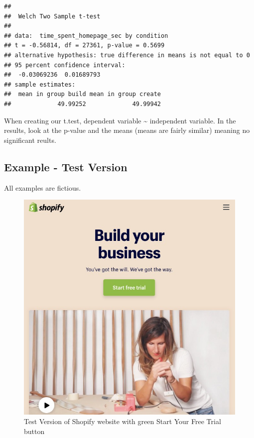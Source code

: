 \documentclass[]{article}
\begin{document}
\begin{verbatim}
## 
##  Welch Two Sample t-test
## 
## data:  time_spent_homepage_sec by condition
## t = -0.56814, df = 27361, p-value = 0.5699
## alternative hypothesis: true difference in means is not equal to 0
## 95 percent confidence interval:
##  -0.03069236  0.01689793
## sample estimates:
##  mean in group build mean in group create 
##             49.99252             49.99942
\end{verbatim}

When creating our t.test, dependent variable \textasciitilde{}
independent variable. In the results, look at the p-value and the means
(means are fairly similar) meaning no significant reults.

\subsection{Example - Test Version}\label{example---test-version}

All examples are fictious.

\begin{figure}
\centering
\includegraphics{docs/test.jpg}
\caption{Test Version of Shopify website with green Start Your Free
Trial button}
\end{figure}
\end{document}
